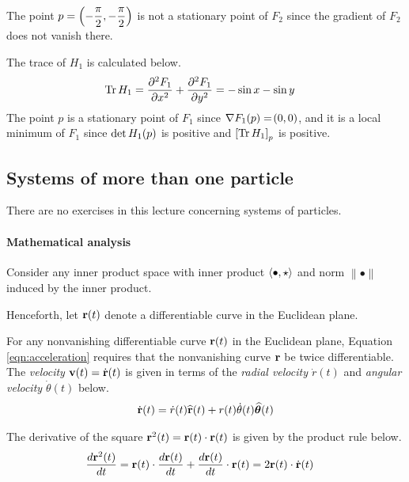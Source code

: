\begin{answer}
	The point $\displaystyle p = \left(-\frac{\pi}{2}, -\frac{\pi}{2}\right)$ is not a stationary point of $F_2$ since the gradient of $F_2$ does not vanish there.

	The trace of $H_1$ is calculated below.
	\begin{align}
		\operatorname{Tr} H_1 & = \frac{\partial^2 F_1}{\partial x^2} + \frac{\partial^2 F_1}{\partial y^2} = - \sin x - \sin y
	\end{align}
	The point $p$ is a stationary point of $F_1$ since $\nabla F_1(p) = \!\left(0, 0\right)$, and it is a local minimum of $F_1$ since $\det H_1\!\left(p\right)$ is positive and $\left[\operatorname{Tr} H_1\right]_p$ is positive.
\end{answer}

\subsection{Systems of more than one particle}

There are no exercises in this lecture concerning systems of particles.

\paragraph{Mathematical analysis}

Consider any inner product space with inner product $\braket{\bullet, \star}$ and norm $\left\|\bullet\right\|$ induced by the inner product.

Henceforth, let $\mathbf{r}(t)$ denote a differentiable curve in the Euclidean plane.

\begin{remark}\label{rem:polar}
	For any nonvanishing differentiable curve $\mathbf{r}(t)$ in the Euclidean plane, Equation \eqref{eqn:acceleration} requires that the nonvanishing curve $\mathbf{r}$ be twice differentiable.
	The \emph{velocity} $\mathbf{v}(t) = \dot{\mathbf{r}}(t)$ is given in terms of the \emph{radial velocity $\dot{r}(t)$} and \emph{angular velocity $\dot{\theta}(t)$} below.
	\begin{align}\label{eqn:velocity}
		\dot{\mathbf{r}}(t) = \dot{r}(t) \widehat{\mathbf{r}}(t) + r(t) \dot{\theta}(t) \widehat{\bm{\theta}}(t)
	\end{align}
\end{remark}

The derivative of the square $\mathbf{r}^2(t) = \mathbf{r}(t) \cdot \mathbf{r}(t)$ is given by the product rule below.
\begin{align}\label{eqn:square}
	\frac{d \mathbf{r}^2(t)}{dt} & = \mathbf{r}(t) \cdot \frac{d \mathbf{r}(t)}{dt} + \frac{d \mathbf{r}(t)}{dt} \cdot \mathbf{r}(t) = 2 \mathbf{r}(t) \cdot \dot{\mathbf{r}}(t)
\end{align}

